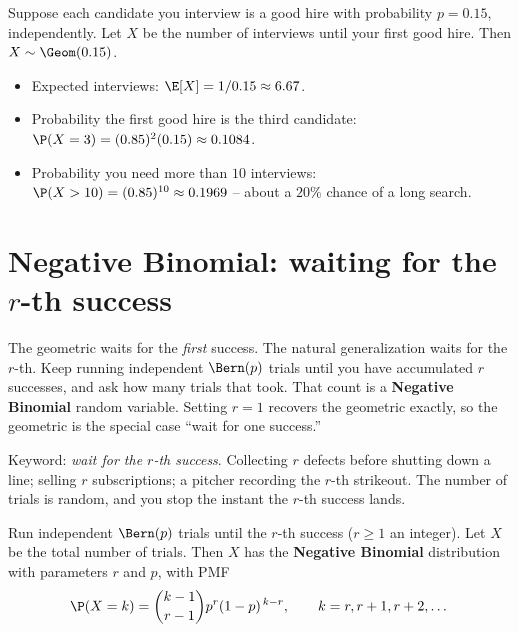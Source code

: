 \begin{example}
\label{ch07:ex-hiring}
Suppose each candidate you interview is a good hire with probability $p = 0.15$,
independently. Let $X$ be the number of interviews until your first good hire.
Then $X \sim \Geom(0.15)$.
\begin{itemize}
\item Expected interviews: $\E[X] = 1/0.15 \approx 6.67$.
\item Probability the first good hire is the third candidate:
  $\P(X = 3) = (0.85)^2 (0.15) \approx 0.1084$.
\item Probability you need more than $10$ interviews:
  $\P(X > 10) = (0.85)^{10} \approx 0.1969$ -- about a $20\%$ chance of a long
  search.
\end{itemize}
\end{example}

\section{Negative Binomial: waiting for the $r$-th success}
\label{ch07:negbinom}

The geometric waits for the \emph{first} success. The natural generalization
waits for the $r$-th. Keep running independent $\Bern(p)$ trials until you have
accumulated $r$ successes, and ask how many trials that took. That count is a
\textbf{Negative Binomial} random variable. Setting $r = 1$ recovers the
geometric exactly, so the geometric is the special case ``wait for one success.''

\begin{intuitionbox}
Keyword: \emph{wait for the $r$-th success}. Collecting $r$ defects before
shutting down a line; selling $r$ subscriptions; a pitcher recording the $r$-th
strikeout. The number of trials is random, and you stop the instant the $r$-th
success lands.
\end{intuitionbox}

\begin{definition}
\label{ch07:def-negbinom}
Run independent $\Bern(p)$ trials until the $r$-th success ($r \ge 1$ an integer).
Let $X$ be the total number of trials. Then $X$ has the \textbf{Negative
Binomial} distribution with parameters $r$ and $p$, with PMF
\[
  \P(X = k) = \binom{k-1}{r-1} p^{r} (1-p)^{\,k-r}, \qquad k = r, r+1, r+2, \dots
\]
\end{definition}

